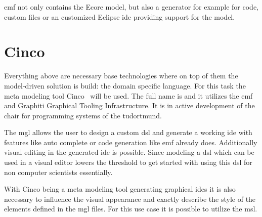 \gls{emf} not only contains the Ecore model, but also a generator for example for code, custom files or an customized Eclipse \gls{ide} providing support for the model.


\section{Cinco}
Everything above are necessary base technologies where on top of them the model-driven solution  is build: the domain specific language. For this task the meta modeling tool Cinco~\cite{CincoHomepage} will be used. The full name is  and it utilizes the \gls{emf} and Graphiti Graphical Tooling Infrastructure. It is in active development of the chair for programming systems of the \gls{tudortmund}.

The \gls{mgl} allows the user to design a custom \gls{dsl} and generate a working \gls{ide} with features like auto complete or code generation like \gls{emf} already does. Additionally visual editing in the generated \gls{ide} is possible. Since modeling a \gls{dsl} which can be used in a visual editor lowers the threshold to get started with using this \gls{dsl} for non computer scientists essentially. 

With Cinco being a meta modeling tool generating graphical \glspl{ide} it is also necessary to influence the visual appearance and exactly describe the style of the elements defined in the \gls{mgl} files. For this use case it is possible to utilize the \gls{msl}.

